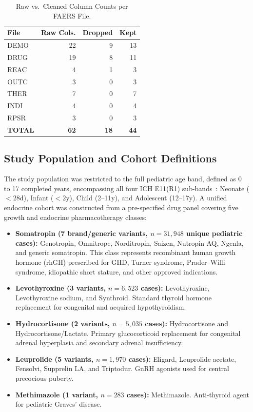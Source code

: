 \documentclass[10pt,twocolumn]{article}
\newcommand{\FAERS}{\textsf{FAERS}\xspace}
\begin{document}
\begin{table}[htbp]
\caption{Raw vs.\ Cleaned Column Counts per \FAERS File.}
\label{tab:colcounts}
\centering\footnotesize\setlength{\tabcolsep}{4pt}
\begin{tabular}{|l|r|r|r|}
\hline
\rowcolor{tableHead}
\color{white}\textbf{File}&
\color{white}\textbf{Raw Cols.}&
\color{white}\textbf{Dropped}&
\color{white}\textbf{Kept}\\
\hline
\rowcolor{rowA}DEMO&22&9&13\\
\hline
\rowcolor{rowB}DRUG&19&8&11\\
\hline
\rowcolor{rowA}REAC&4&1&3\\
\hline
\rowcolor{rowB}OUTC&3&0&3\\
\hline
\rowcolor{rowA}THER&7&0&7\\
\hline
\rowcolor{rowB}INDI&4&0&4\\
\hline
\rowcolor{rowA}RPSR&3&0&3\\
\hline
\rowcolor{jpbiLight}
\textbf{TOTAL}&\textbf{62}&\textbf{18}&\textbf{44}\\
\hline
\end{tabular}
\end{table}
 
\subsection{Study Population and Cohort Definitions}
The study population was restricted to the full pediatric age band, defined as 0 to 17 completed years, encompassing all four ICH E11(R1) sub-bands~\cite{ich2017}: Neonate ($<\!28$d), Infant ($<\!2$y), Child (2--11y), and Adolescent (12--17y). A unified endocrine cohort was constructed from a pre-specified drug panel covering five growth and endocrine pharmacotherapy classes:
 
\begin{itemize}[leftmargin=*]
\item \textbf{Somatropin (7 brand/generic variants, $n = 31{,}948$ unique pediatric cases):} Genotropin, Omnitrope, Norditropin, Saizen, Nutropin AQ, Ngenla, and generic somatropin. This class represents recombinant human growth hormone (rhGH) prescribed for GHD, Turner syndrome, Prader--Willi syndrome, idiopathic short stature, and other approved indications.
\item \textbf{Levothyroxine (3 variants, $n = 6{,}523$ cases):} Levothyroxine, Levothyroxine sodium, and Synthroid. Standard thyroid hormone replacement for congenital and acquired hypothyroidism.
\item \textbf{Hydrocortisone (2 variants, $n = 5{,}035$ cases):} Hydrocortisone and Hydrocortisone/Lactate. Primary glucocorticoid replacement for congenital adrenal hyperplasia and secondary adrenal insufficiency.
\item \textbf{Leuprolide (5 variants, $n = 1{,}970$ cases):} Eligard, Leuprolide acetate, Fensolvi, Supprelin LA, and Triptodur. GnRH agonists used for central precocious puberty.
\item \textbf{Methimazole (1 variant, $n = 283$ cases):} Methimazole. Anti-thyroid agent for pediatric Graves' disease.
\end{itemize}
 
\end{document}
